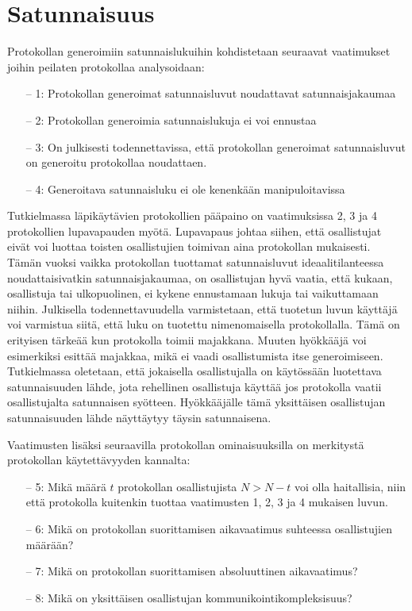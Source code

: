 \section{Satunnaisuus}

Protokollan generoimiin satunnaislukuihin kohdistetaan seuraavat vaatimukset joihin peilaten protokollaa analysoidaan:
\begin{itemize}
    \item[--] 1: Protokollan generoimat satunnaisluvut noudattavat satunnaisjakaumaa
    \item[--] 2: Protokollan generoimia satunnaislukuja ei voi ennustaa
    \item[--] 3: On julkisesti todennettavissa, että protokollan generoimat satunnaisluvut on generoitu protokollaa noudattaen.
    \item[--] 4: Generoitava satunnaisluku ei ole kenenkään manipuloitavissa
\end{itemize}

Tutkielmassa läpikäytävien protokollien pääpaino on vaatimuksissa 2, 3 ja 4 protokollien lupavapauden myötä. Lupavapaus johtaa siihen, että osallistujat eivät voi luottaa toisten osallistujien toimivan aina protokollan mukaisesti. Tämän vuoksi vaikka protokollan tuottamat satunnaisluvut ideaalitilanteessa noudattaisivatkin satunnaisjakaumaa, on osallistujan hyvä vaatia, että kukaan, osallistuja tai ulkopuolinen, ei kykene ennustamaan lukuja tai vaikuttamaan niihin. Julkisella todennettavuudella varmistetaan, että 
tuotetun luvun käyttäjä voi varmistua siitä, että luku on tuotettu nimenomaisella protokollalla. Tämä on erityisen tärkeää kun protokolla toimii majakkana. Muuten hyökkääjä voi esimerkiksi esittää majakkaa, mikä ei vaadi osallistumista itse generoimiseen. Tutkielmassa oletetaan, että jokaisella osallistujalla on käytössään luotettava satunnaisuuden lähde, jota rehellinen osallistuja käyttää jos protokolla vaatii osallistujalta satunnaisen syötteen. Hyökkääjälle tämä yksittäisen osallistujan satunnaisuuden lähde näyttäytyy täysin satunnaisena.

Vaatimusten lisäksi seuraavilla protokollan ominaisuuksilla on merkitystä protokollan käytettävyyden kannalta:

\begin{itemize}
    \item[--] 5: Mikä määrä $t$ protokollan osallistujista $N > N - t$ voi olla haitallisia, niin että protokolla kuitenkin tuottaa vaatimusten 1, 2, 3 ja 4 mukaisen luvun.
    \item[--] 6: Mikä on protokollan suorittamisen aikavaatimus suhteessa osallistujien määrään?
    \item[--] 7: Mikä on protokollan suorittamisen absoluuttinen aikavaatimus?
    \item[--] 8: Mikä on yksittäisen osallistujan kommunikointikompleksisuus?
\end{itemize}

